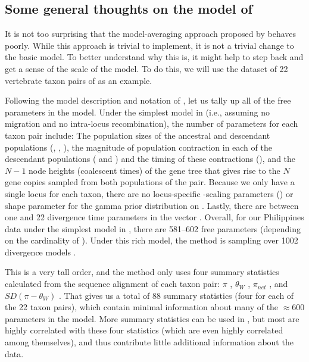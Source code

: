 \documentclass[letterpaper,12pt]{article}
\begin{document}
\begin{linenumbers}
\section*{Some general thoughts on the model of \msb}
It is not too surprising that the model-averaging approach proposed by
\citet{Hickerson2013} behaves poorly.
While this approach is trivial to implement, it is not a trivial change
to the basic \msb model.
To better understand why this is, it might help to step back and get a
sense of the scale of the \msb model.
To do this, we will use the dataset of 22 vertebrate taxon pairs of
\citet{Oaks2012} as an example.

Following the model description and notation of \citet{Oaks2012}, let us tally
up all of the free parameters in the \msb model.  Under the simplest model in
\msb (i.e., assuming no migration and
no intra-locus recombination), the number of parameters for each
taxon pair include:
The population sizes of the ancestral and descendant populations
(\ancestralTheta{}, , ),
the magnitude of population contraction in each of the descendant
populations ( and ) and the
timing of these contractions (\bottleTime{}), and the $N-1$ node heights
(coalescent times) of the gene tree that gives rise to the $N$ gene
copies sampled from both populations of the pair.
Because we only have a single locus for each taxon, there are no locus-specific
\myTheta{}-scaling parameters (\locusMutationRateScalar{}) or
\locusRateHetShapeParameter shape parameter for the gamma prior distribution on
\locusMutationRateScalar{}.
Lastly, there are between one and 22 divergence time parameters \divt{} in
the vector \divtvector.
Overall, for our Philippines data under the simplest model in \msb, there are
581--602 free parameters (depending on the cardinality of \divtvector).
Under this rich model, the method is sampling over 1002 divergence models
\citep[i.e., the number of integer partitions of $Y=22$;][]{Oaks2012}.

This is a very tall order, and the method only uses four summary statistics
calculated from the sequence alignment of each taxon pair:
$\pi$ \citep{Tajima1983}, $\theta_W$
\citep{Watterson1975}, $\pi_{net}$ \citep{Takahata1985}, and
$SD(\pi-\theta_W)$ \citep{Tajima1989}.
That gives us a total of 88 summary statistics (four for each of the 22 taxon
pairs), which contain minimal information about many of the $\approx 600$
parameters in the model.
More summary statistics can be used in \msb, but most are highly correlated
with these four statistics (which are even highly correlated among themselves),
and thus contribute little additional information about the data.


\end{linenumbers}
\end{document}
